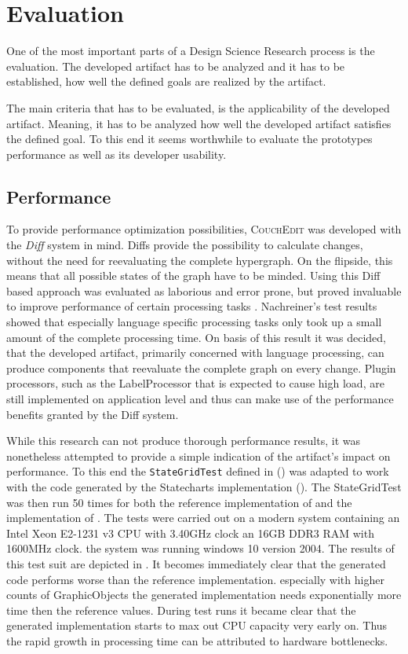 \chapter{Evaluation}
\label{ch:evaluation}
One of the most important parts of a Design Science Research process is the evaluation. The developed artifact has to be analyzed and it has to be established, how well the defined goals are realized by the artifact.

The main criteria that has to be evaluated, is the applicability of the developed artifact. Meaning, it has to be analyzed how well the developed artifact satisfies the defined goal. To this end it seems worthwhile to evaluate the prototypes performance as well as its developer usability.

\section{Performance}
\label{sec:performance}
To provide performance optimization possibilities, \textsc{CouchEdit} was developed with the \emph{Diff} system in mind. Diffs provide the possibility to calculate changes, without the need for reevaluating the complete hypergraph. On the flipside, this means that all possible states of the graph have to be minded. Using this Diff based approach was evaluated as laborious and error prone, but proved invaluable to improve performance of certain processing tasks \cite{nachreiner_couchedit_2020}. Nachreiner's test results showed that especially language specific processing tasks only took up a small amount of the complete processing time. On basis of this result it was decided, that the developed artifact, primarily concerned with language processing, can produce components that reevaluate the complete graph on every change. Plugin processors, such as the LabelProcessor that is expected to cause high load, are still implemented on application level and thus can make use of the performance benefits granted by the Diff system.

While this research can not produce thorough performance results, it was nonetheless attempted to provide a simple indication of the artifact's impact on performance. To this end the \texttt{StateGridTest} defined in \cite{nachreiner_couchedit_2020} () was adapted to work with the code generated by the Statecharts implementation (). The StateGridTest was then run 50 times for both the reference implementation of \cite{nachreiner_couchedit_2020} and the implementation of . The tests were carried out on a modern system containing an Intel Xeon E2-1231 v3 CPU with 3.40GHz clock an 16GB DDR3 RAM with 1600MHz clock. the system was running windows 10 version 2004. The results of this test suit are depicted in . It becomes immediately clear that the generated code performs worse than the reference implementation. especially with higher counts of GraphicObjects the generated implementation needs exponentially more time then the reference values. During test runs it became clear that the generated implementation starts to max out CPU capacity very early on. Thus the rapid growth in processing time can be attributed to hardware bottlenecks. 

